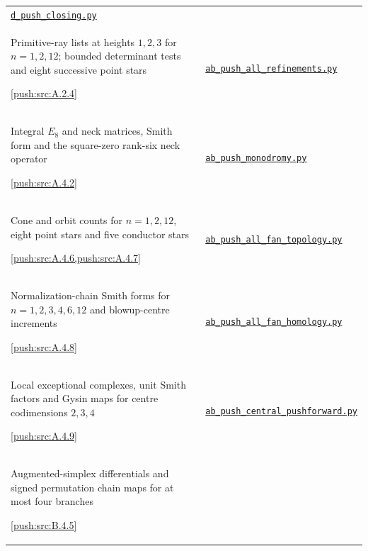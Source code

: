 {\begin{longtable}{@{}>{\raggedright\arraybackslash}p{}>{\raggedright\arraybackslash}p{}@{}}
\href{https://raw.githubusercontent.com/KokunoYumeto/s6-complex-structure-workbench/\SsixRepositoryCommit/pro_returns/S6_02_PUSH_final_20261115T2217Z/S6_02_PUSH/code/d_push_closing.py}{\nolinkurl{d_push_closing.py}} \\[3pt]
Primitive-ray lists at heights $1,2,3$ for $n=1,2,12$; bounded determinant tests and eight successive point stars\par \cref{push:src:A.2.4} &
\href{https://raw.githubusercontent.com/KokunoYumeto/s6-complex-structure-workbench/\SsixRepositoryCommit/pro_returns/S6_02_PUSH_final_20261115T2217Z/S6_02_PUSH/code/ab_push_all_refinements.py}{\nolinkurl{ab_push_all_refinements.py}} \\[3pt]
Integral $E_8$ and neck matrices, Smith form and the square-zero rank-six neck operator\par \cref{push:src:A.4.2} &
\href{https://raw.githubusercontent.com/KokunoYumeto/s6-complex-structure-workbench/\SsixRepositoryCommit/pro_returns/S6_02_PUSH_final_20261115T2217Z/S6_02_PUSH/code/ab_push_monodromy.py}{\nolinkurl{ab_push_monodromy.py}} \\[3pt]
Cone and orbit counts for $n=1,2,12$, eight point stars and five conductor stars\par \cref{push:src:A.4.6,push:src:A.4.7} &
\href{https://raw.githubusercontent.com/KokunoYumeto/s6-complex-structure-workbench/\SsixRepositoryCommit/pro_returns/S6_02_PUSH_final_20261115T2217Z/S6_02_PUSH/code/ab_push_all_fan_topology.py}{\nolinkurl{ab_push_all_fan_topology.py}} \\[3pt]
Normalization-chain Smith forms for $n=1,2,3,4,6,12$ and blowup-centre increments\par \cref{push:src:A.4.8} &
\href{https://raw.githubusercontent.com/KokunoYumeto/s6-complex-structure-workbench/\SsixRepositoryCommit/pro_returns/S6_02_PUSH_final_20261115T2217Z/S6_02_PUSH/code/ab_push_all_fan_homology.py}{\nolinkurl{ab_push_all_fan_homology.py}} \\[3pt]
Local exceptional complexes, unit Smith factors and Gysin maps for centre codimensions $2,3,4$\par \cref{push:src:A.4.9} &
\href{https://raw.githubusercontent.com/KokunoYumeto/s6-complex-structure-workbench/\SsixRepositoryCommit/pro_returns/S6_02_PUSH_final_20261115T2217Z/S6_02_PUSH/code/ab_push_central_pushforward.py}{\nolinkurl{ab_push_central_pushforward.py}} \\[3pt]
Augmented-simplex differentials and signed permutation chain maps for at most four branches\par \cref{push:src:B.4.5} &

\end{longtable}}
